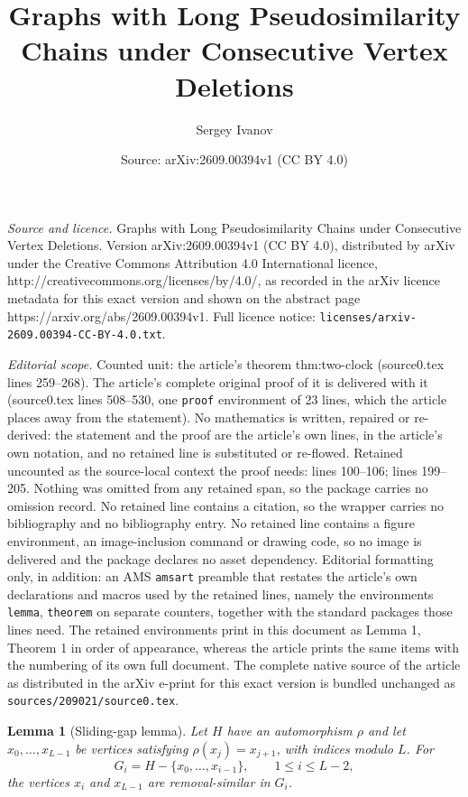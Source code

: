 \documentclass[10pt,a4paper]{amsart}
\title{Graphs with Long Pseudosimilarity Chains under Consecutive Vertex Deletions}
\author{Sergey Ivanov}
\date{Source: arXiv:2609.00394v1 (CC BY 4.0)}
\newtheorem{lemma}{Lemma}
\begin{document}
\maketitle

\noindent\emph{Source and licence.} Graphs with Long Pseudosimilarity Chains under Consecutive Vertex Deletions. Version arXiv:2609.00394v1 (CC BY 4.0), distributed by arXiv under the Creative Commons Attribution 4.0 International licence, http://creativecommons.org/licenses/by/4.0/, as recorded in the arXiv licence metadata for this exact version and shown on the abstract page https://arxiv.org/abs/2609.00394v1. Full licence notice: \texttt{licenses/arxiv-2609.00394-CC-BY-4.0.txt}.\par\smallskip

\noindent\textit{Editorial scope.} Counted unit: the article's theorem thm:two-clock (source0.tex lines 259--268). The article's complete original proof of it is delivered with it (source0.tex lines 508--530, one \texttt{proof} environment of 23 lines, which the article places away from the statement). No mathematics is written, repaired or re-derived: the statement and the proof are the article's own lines, in the article's own notation, and no retained line is substituted or re-flowed.  Retained uncounted as the source-local context the proof needs: lines 100--106; lines 199--205.  Nothing was omitted from any retained span, so the package carries no omission record.  No retained line contains a citation, so the wrapper carries no bibliography and no bibliography entry.  No retained line contains a figure environment, an image-inclusion command or drawing code, so no image is delivered and the package declares no asset dependency.  Editorial formatting only, in addition: an AMS \texttt{amsart} preamble that restates the article's own declarations and macros used by the retained lines, namely the environments \texttt{lemma}, \texttt{theorem} on separate counters, together with the standard packages those lines need.  The retained environments print in this document as Lemma 1, Theorem 1 in order of appearance, whereas the article prints the same items with the numbering of its own full document.  The complete native source of the article as distributed in the arXiv e-print for this exact version is bundled unchanged as \texttt{sources/209021/source0.tex}.
\begin{lemma}[Sliding-gap lemma]\label{lem:sliding-gap}
Let $H$ have an automorphism $\rho$ and let $x_0,\ldots,x_{L-1}$ be vertices satisfying $\rho(x_j)=x_{j+1}$, with indices modulo $L$. For
\[
    G_i=H-\{x_0,\ldots,x_{i-1}\},\qquad 1\le i\le L-2,
\]
the vertices $x_i$ and $x_{L-1}$ are removal-similar in $G_i$.
\end{lemma}
\end{document}
